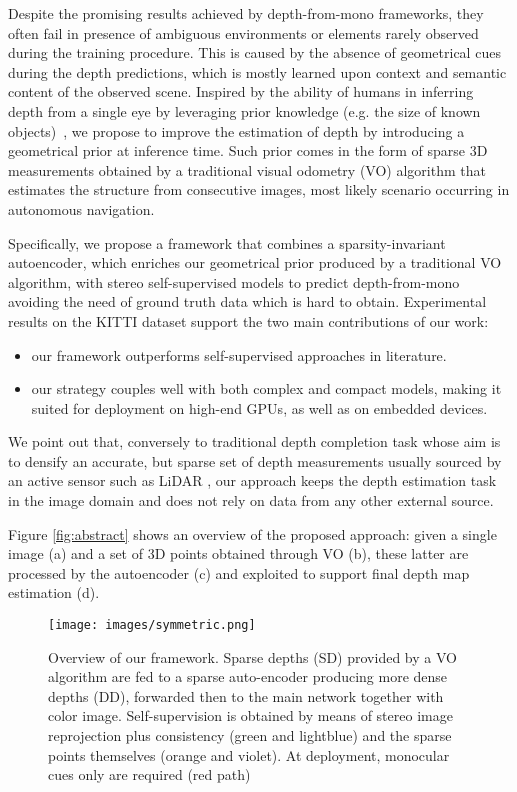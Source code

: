 \documentclass[10pt,twocolumn,letterpaper]{article}
\begin{document}
Despite the promising results achieved by depth-from-mono frameworks, they often fail in presence of ambiguous environments or elements rarely observed during the training procedure. This is caused by the absence of geometrical cues during the depth predictions, which is mostly learned upon context and semantic content of the observed scene. 
Inspired by the ability of humans in inferring depth from a single eye by leveraging prior knowledge (e.g. the size of known objects)~\cite{howard_2012}, we propose to improve the estimation of depth by introducing a geometrical prior at inference time. Such prior comes in the form of sparse 3D measurements obtained by a traditional visual odometry (VO) algorithm that estimates the structure from consecutive images, most likely scenario occurring in autonomous navigation.

Specifically, we propose a framework that combines a sparsity-invariant \cite{sparse_conv} autoencoder, which enriches our geometrical prior produced by a traditional VO algorithm, with stereo self-supervised models \cite{Godard1,pydnet18} to predict depth-from-mono avoiding the need of ground truth data which is hard to obtain. 
Experimental results on the KITTI dataset \cite{kitti} support the two main contributions of our work:

\begin{itemize}
    \item our framework outperforms self-supervised approaches in literature.
    \item our strategy couples well with both complex \cite{Godard1} and compact \cite{pydnet18} models, making it suited for deployment on high-end GPUs, as well as on embedded devices.
\end{itemize}
We point out that, conversely to traditional depth completion task \cite{sparse_conv} whose aim is to densify an accurate, but sparse set of depth measurements usually sourced by an active sensor such as LiDAR \cite{sparse_conv}, our approach keeps the depth estimation task in the image domain and does not rely on data from any other external source.

Figure \ref{fig:abstract} shows an overview of the proposed approach: given a single image (a) and a set of 3D points obtained through VO (b), these latter are processed by the autoencoder (c) and exploited to support final depth map estimation (d).

 
\begin{figure*}
    \centering
    \texttt{[image: images/symmetric.png]}
    \caption{Overview of our framework. Sparse depths (SD) provided by a VO algorithm are fed to a sparse auto-encoder producing more dense depths (DD), forwarded then to the main network together with color image. Self-supervision is obtained by means of stereo image reprojection plus consistency (green and lightblue) and the sparse points themselves (orange and violet). At deployment, monocular cues only are required (red path) \label{fig:model_compare}}
\end{figure*}
\end{document}
